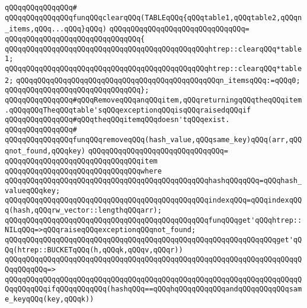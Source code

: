 \verb|qQQqqQQqqQQqqQQq#|\newline
\verb|qQQqqQQqqQQqqQQqfunqQQqclearqQQq(TABLEqQQq{qQQqtable1,qQQqtable2,qQQqn_items,qQQq...qQQq}qQQq)|\newline
\verb|qQQqqQQqqQQqqQQqqQQqqQQqqQQqqQQq=|\newline
\verb|qQQqqQQqqQQqqQQqqQQqqQQqqQQqqQQq{|\newline
\verb|qQQqqQQqqQQqqQQqqQQqqQQqqQQqqQQqqQQqqQQqqQQqqQQqhtrep::clearqQQq*table1;|\newline
\verb|qQQqqQQqqQQqqQQqqQQqqQQqqQQqqQQqqQQqqQQqqQQqqQQqhtrep::clearqQQq*table2;|\newline
\verb|qQQqqQQqqQQqqQQqqQQqqQQqqQQqqQQqqQQqqQQqqQQqqQQqn_itemsqQQq:=qQQq0;|\newline
\verb|qQQqqQQqqQQqqQQqqQQqqQQqqQQqqQQq};|\newline
\newline
\verb|qQQqqQQqqQQqqQQq#qQQqRemoveqQQqanqQQqitem,qQQqreturningqQQqtheqQQqitem.qQQqqQQqTheqQQqtable'sqQQqexceptionqQQqisqQQqraisedqQQqif|\newline
\verb|qQQqqQQqqQQqqQQq#qQQqtheqQQqitemqQQqdoesn'tqQQqexist.|\newline
\verb|qQQqqQQqqQQqqQQq#|\newline
\verb|qQQqqQQqqQQqqQQqfunqQQqremoveqQQq(hash_value,qQQqsame_key)qQQq(arr,qQQqnot_found,qQQqkey)|\newline
\verb|qQQqqQQqqQQqqQQqqQQqqQQqqQQqqQQq=|\newline
\verb|qQQqqQQqqQQqqQQqqQQqqQQqqQQqqQQqitem|\newline
\verb|qQQqqQQqqQQqqQQqqQQqqQQqqQQqqQQqwhere|\newline
\verb|qQQqqQQqqQQqqQQqqQQqqQQqqQQqqQQqqQQqqQQqqQQqqQQqhashqQQqqQQq=qQQqhash_valueqQQqkey;|\newline
\newline
\verb|qQQqqQQqqQQqqQQqqQQqqQQqqQQqqQQqqQQqqQQqqQQqqQQqindexqQQq=qQQqindexqQQq(hash,qQQqrw_vector::lengthqQQqarr);|\newline
\newline
\verb|qQQqqQQqqQQqqQQqqQQqqQQqqQQqqQQqqQQqqQQqqQQqqQQqfunqQQqget'qQQqhtrep::NILqQQq=>qQQqraiseqQQqexceptionqQQqnot_found;|\newline
\verb|qQQqqQQqqQQqqQQqqQQqqQQqqQQqqQQqqQQqqQQqqQQqqQQqqQQqqQQqqQQqqQQqget'qQQq(htrep::BUCKETqQQq(h,qQQqk,qQQqv,qQQqr))|\newline
\verb|qQQqqQQqqQQqqQQqqQQqqQQqqQQqqQQqqQQqqQQqqQQqqQQqqQQqqQQqqQQqqQQqqQQqqQQqqQQqqQQq=>|\newline
\verb|qQQqqQQqqQQqqQQqqQQqqQQqqQQqqQQqqQQqqQQqqQQqqQQqqQQqqQQqqQQqqQQqqQQqqQQqqQQqqQQqifqQQqqQQqqQQq(hashqQQq==qQQqhqQQqqQQqqQQqandqQQqqQQqqQQqsame_keyqQQq(key,qQQqk))|\newline

